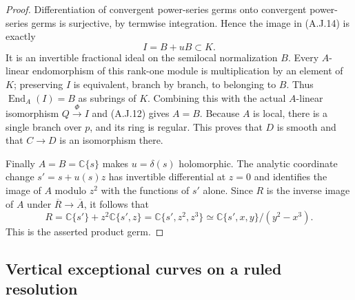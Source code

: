\begin{proof}
Differentiation of convergent power-series germs onto
convergent power-series germs is surjective, by termwise
integration. Hence the image in (A.J.14) is exactly
\[
 I=B+uB\subset K.                                \tag{A.J.15}
\]
It is an invertible fractional ideal on the semilocal
normalization $B$. Every $A$-linear endomorphism of this
rank-one module is multiplication by an element of $K$;
preserving $I$ is equivalent, branch by branch, to belonging
to $B$. Thus $\operatorname{End}_A(I)=B$ as subrings of
$K$. Combining this with the actual $A$-linear isomorphism
$Q\xrightarrow{\Phi}I$ and (A.J.12) gives $A=B$.
Because $A$ is local, there is a single branch over $p$,
and its ring is regular. This proves that $D$ is smooth
and that $C\to D$ is an isomorphism there.

Finally $A=B=\mathbb C\{s\}$ makes $u=\delta(s)$
holomorphic. The analytic coordinate change
$s'=s+u(s)z$ has invertible differential at $z=0$ and
identifies the image of $A$ modulo $z^2$ with the functions
of $s'$ alone. Since $R$ is the inverse image of $A$ under
$\overline R\to\overline A$, it follows that
\[
 R=\mathbb C\{s'\}+z^2\mathbb C\{s',z\}
   =\mathbb C\{s',z^2,z^3\}
   \simeq\mathbb C\{s',x,y\}/(y^2-x^3).
                                                        \tag{A.J.16}
\]
This is the asserted product germ.
\end{proof}

\subsection{Vertical exceptional curves on a ruled resolution}

